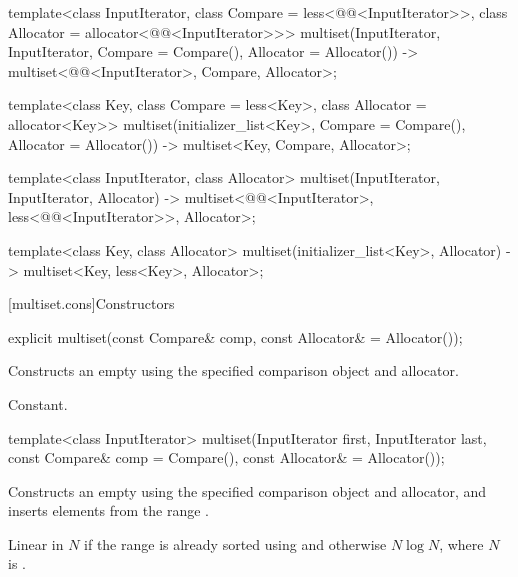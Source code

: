 \begin{codeblock}
{  template<class InputIterator,
           class Compare = less<@@<InputIterator>>,
           class Allocator = allocator<@@<InputIterator>>>
    multiset(InputIterator, InputIterator,
             Compare = Compare(), Allocator = Allocator())
      -> multiset<@@<InputIterator>, Compare, Allocator>;

  template<class Key, class Compare = less<Key>, class Allocator = allocator<Key>>
    multiset(initializer_list<Key>, Compare = Compare(), Allocator = Allocator())
      -> multiset<Key, Compare, Allocator>;

  template<class InputIterator, class Allocator>
    multiset(InputIterator, InputIterator, Allocator)
      -> multiset<@@<InputIterator>,
                  less<@@<InputIterator>>, Allocator>;

  template<class Key, class Allocator>
    multiset(initializer_list<Key>, Allocator) -> multiset<Key, less<Key>, Allocator>;
}
\end{codeblock}%
%

[multiset.cons]{Constructors}

%
\begin{itemdecl}
explicit multiset(const Compare& comp, const Allocator& = Allocator());
\end{itemdecl}

\begin{itemdescr}
\pnum
\effects
Constructs an empty  using the specified comparison object and allocator.

\pnum
\complexity
Constant.
\end{itemdescr}

%
\begin{itemdecl}
template<class InputIterator>
  multiset(InputIterator first, InputIterator last,
           const Compare& comp = Compare(), const Allocator& = Allocator());
\end{itemdecl}

\begin{itemdescr}
\pnum
\effects
Constructs an empty
using the specified comparison object and allocator,
and inserts elements from the range
.

\pnum
\complexity
Linear in $N$
if the range
is already sorted using  and otherwise $N \log N$,
where $N$ is
.
\end{itemdescr}

